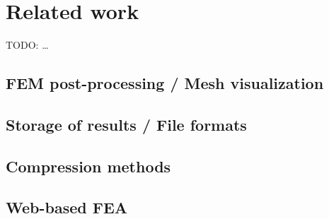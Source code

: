 \chapter{Related work}
\label{chapter:related-work}

TODO: \ldots

\section{FEM post-processing / Mesh visualization}


\section{Storage of results / File formats}


\cite{VTK2015}
\cite{GiDPostProcess}

\section{Compression methods}



\section{Web-based FEA}
\cite{Ari2013}
\cite{Yu2010}
\cite{Peng2003}
\cite{Heber2007I}
\cite{Heber2007II}
\cite{Weng2011}
\cite{Chen2008}

